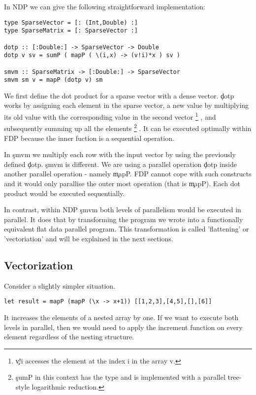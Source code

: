     In NDP we can give the following straightforward implementation:
    \begin{lstlisting}
type SparseVector = [: (Int,Double) :]
type SparseMatrix = [: SparseVector :]

dotp :: [:Double:] -> SparseVector -> Double
dotp v sv = sumP ( mapP ( \(i,x) -> (v!i)*x ) sv )

smvm :: SparseMatrix -> [:Double:] -> SparseVector
smvm sm v = mapP (dotp v) sm
    \end{lstlisting}
    We first define the dot product for a sparse vector with a dense vector.
    \c{dotp} works by assigning each element in the sparse vector,
    a new value by multiplying its old value with the corresponding
    value in the second vector
    \footnote{\c{v!i} accesses the element at the index i in the array v.}
    , and subsequently summing up all the elements
    \footnote{\c{sumP} in this context has the type  and
    is implemented with a parallel tree-style logarithmic reduction.}
    .
    It can be executed optimally within FDP because the inner fuction is a sequential operation.
    
    In \c{smvm} we multiply each row with the input vector by using
    the previously defined \c{dotp}. \c{smvm} is different.
    We are using a parallel operation \c{dotp} inside another parallel operation - namely \c{mapP}.
    FDP cannot cope with such constructs and it would only parallise the
    outer most operation (that is \c{mapP}). Each dot product would
    be executed sequentially.
    
    In contrast, within NDP \c{smvm} both levels of parallelism
    would be executed in parallel.
    It does that by transforming the program we wrote into a
    functionally equivalent flat data parallel program. This transformation
    is called 'flattening' or 'vectoriation' and will be explained in the next sections.
    
  \subsection{Vectorization}
    
    Consider a slightly simpler situation.
      
    \begin{lstlisting}
let result = mapP (mapP (\x -> x+1)) [[1,2,3],[4,5],[],[6]]
    \end{lstlisting}
    It increases the elements of a nested array by one.
    If we want to execute both levels in parallel,
    then we would need to apply the increment function on
    every element regardless of the nesting structure.
    
